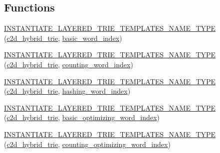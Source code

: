 \subsection*{Functions}
\begin{DoxyCompactItemize}
\item 
\hyperlink{namespaceuva_1_1smt_1_1bpbd_1_1server_1_1lm_a539857ec974cc701bac31d5dd68e8555}{I\+N\+S\+T\+A\+N\+T\+I\+A\+T\+E\+\_\+\+L\+A\+Y\+E\+R\+E\+D\+\_\+\+T\+R\+I\+E\+\_\+\+T\+E\+M\+P\+L\+A\+T\+E\+S\+\_\+\+N\+A\+M\+E\+\_\+\+T\+Y\+P\+E} (\hyperlink{classuva_1_1smt_1_1bpbd_1_1server_1_1lm_1_1c2d__hybrid__trie}{c2d\+\_\+hybrid\+\_\+trie}, \hyperlink{classuva_1_1smt_1_1bpbd_1_1server_1_1lm_1_1dictionary_1_1basic__word__index}{basic\+\_\+word\+\_\+index})
\item 
\hyperlink{namespaceuva_1_1smt_1_1bpbd_1_1server_1_1lm_af90ec30af661f3c7ceb4d70dd2078c28}{I\+N\+S\+T\+A\+N\+T\+I\+A\+T\+E\+\_\+\+L\+A\+Y\+E\+R\+E\+D\+\_\+\+T\+R\+I\+E\+\_\+\+T\+E\+M\+P\+L\+A\+T\+E\+S\+\_\+\+N\+A\+M\+E\+\_\+\+T\+Y\+P\+E} (\hyperlink{classuva_1_1smt_1_1bpbd_1_1server_1_1lm_1_1c2d__hybrid__trie}{c2d\+\_\+hybrid\+\_\+trie}, \hyperlink{classuva_1_1smt_1_1bpbd_1_1server_1_1lm_1_1dictionary_1_1counting__word__index}{counting\+\_\+word\+\_\+index})
\item 
\hyperlink{namespaceuva_1_1smt_1_1bpbd_1_1server_1_1lm_a9df6b0c39047051b27fd896d71fe080b}{I\+N\+S\+T\+A\+N\+T\+I\+A\+T\+E\+\_\+\+L\+A\+Y\+E\+R\+E\+D\+\_\+\+T\+R\+I\+E\+\_\+\+T\+E\+M\+P\+L\+A\+T\+E\+S\+\_\+\+N\+A\+M\+E\+\_\+\+T\+Y\+P\+E} (\hyperlink{classuva_1_1smt_1_1bpbd_1_1server_1_1lm_1_1c2d__hybrid__trie}{c2d\+\_\+hybrid\+\_\+trie}, \hyperlink{classuva_1_1smt_1_1bpbd_1_1server_1_1lm_1_1dictionary_1_1hashing__word__index}{hashing\+\_\+word\+\_\+index})
\item 
\hyperlink{namespaceuva_1_1smt_1_1bpbd_1_1server_1_1lm_ad1782f997c5b46b764b4bca06215762f}{I\+N\+S\+T\+A\+N\+T\+I\+A\+T\+E\+\_\+\+L\+A\+Y\+E\+R\+E\+D\+\_\+\+T\+R\+I\+E\+\_\+\+T\+E\+M\+P\+L\+A\+T\+E\+S\+\_\+\+N\+A\+M\+E\+\_\+\+T\+Y\+P\+E} (\hyperlink{classuva_1_1smt_1_1bpbd_1_1server_1_1lm_1_1c2d__hybrid__trie}{c2d\+\_\+hybrid\+\_\+trie}, \hyperlink{namespaceuva_1_1smt_1_1bpbd_1_1server_1_1lm_1_1dictionary_a3001583c904eec702b4a4125082a7ecd}{basic\+\_\+optimizing\+\_\+word\+\_\+index})
\item 
\hyperlink{namespaceuva_1_1smt_1_1bpbd_1_1server_1_1lm_a117a92c5b439afcc7b8a5e8294abeb43}{I\+N\+S\+T\+A\+N\+T\+I\+A\+T\+E\+\_\+\+L\+A\+Y\+E\+R\+E\+D\+\_\+\+T\+R\+I\+E\+\_\+\+T\+E\+M\+P\+L\+A\+T\+E\+S\+\_\+\+N\+A\+M\+E\+\_\+\+T\+Y\+P\+E} (\hyperlink{classuva_1_1smt_1_1bpbd_1_1server_1_1lm_1_1c2d__hybrid__trie}{c2d\+\_\+hybrid\+\_\+trie}, \hyperlink{namespaceuva_1_1smt_1_1bpbd_1_1server_1_1lm_1_1dictionary_a61cbd647b15de785ccf4cdd26661c366}{counting\+\_\+optimizing\+\_\+word\+\_\+index})

\end{DoxyCompactItemize}
